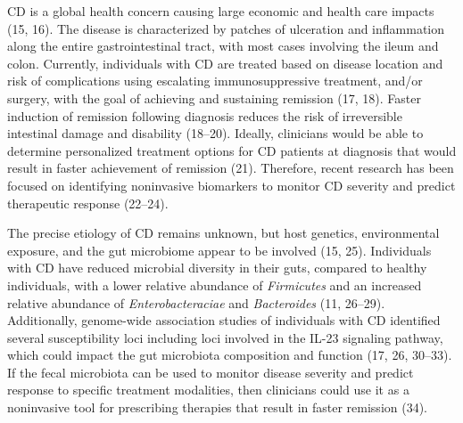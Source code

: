 \documentclass[12pt,]{article}
\begin{document}
CD is a global health concern causing large economic and health care
impacts (15, 16). The disease is characterized by patches of ulceration
and inflammation along the entire gastrointestinal tract, with most
cases involving the ileum and colon. Currently, individuals with CD are
treated based on disease location and risk of complications using
escalating immunosuppressive treatment, and/or surgery, with the goal of
achieving and sustaining remission (17, 18). Faster induction of
remission following diagnosis reduces the risk of irreversible
intestinal damage and disability (18--20). Ideally, clinicians would be
able to determine personalized treatment options for CD patients at
diagnosis that would result in faster achievement of remission (21).
Therefore, recent research has been focused on identifying noninvasive
biomarkers to monitor CD severity and predict therapeutic response
(22--24).

The precise etiology of CD remains unknown, but host genetics,
environmental exposure, and the gut microbiome appear to be involved
(15, 25). Individuals with CD have reduced microbial diversity in their
guts, compared to healthy individuals, with a lower relative abundance
of \emph{Firmicutes} and an increased relative abundance of
\emph{Enterobacteraciae} and \emph{Bacteroides} (11, 26--29).
Additionally, genome-wide association studies of individuals with CD
identified several susceptibility loci including loci involved in the
IL-23 signaling pathway, which could impact the gut microbiota
composition and function (17, 26, 30--33). If the fecal microbiota can
be used to monitor disease severity and predict response to specific
treatment modalities, then clinicians could use it as a noninvasive tool
for prescribing therapies that result in faster remission (34).
\end{document}
